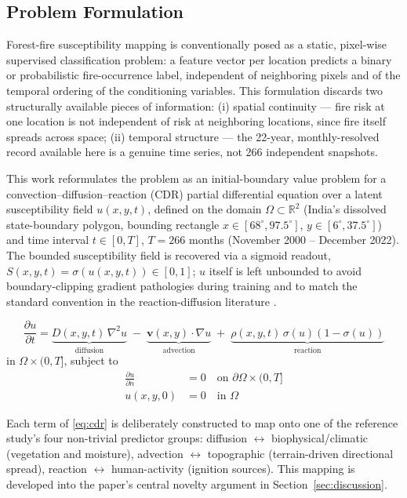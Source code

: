 \documentclass[journal]{IEEEtran}
\begin{document}
\subsection{Problem Formulation}

Forest-fire susceptibility mapping is conventionally posed as a static, pixel-wise supervised classification problem: a feature vector per location predicts a binary or probabilistic fire-occurrence label, independent of neighboring pixels and of the temporal ordering of the conditioning variables. This formulation discards two structurally available pieces of information: (i) spatial continuity --- fire risk at one location is not independent of risk at neighboring locations, since fire itself spreads across space; (ii) temporal structure --- the 22-year, monthly-resolved record available here is a genuine time series, not 266 independent snapshots.

This work reformulates the problem as an initial-boundary value problem for a convection--diffusion--reaction (CDR) partial differential equation over a latent susceptibility field $u(x,y,t)$, defined on the domain $\Omega \subset \mathbb{R}^2$ (India's dissolved state-boundary polygon, bounding rectangle $x\in[68^{\circ},97.5^{\circ}]$, $y\in[6^{\circ},37.5^{\circ}]$) and time interval $t\in[0,T]$, $T=266$ months (November 2000 -- December 2022). The bounded susceptibility field is recovered via a sigmoid readout, $S(x,y,t)=\sigma(u(x,y,t))\in[0,1]$; $u$ itself is left unbounded to avoid boundary-clipping gradient pathologies during training and to match the standard convention in the reaction-diffusion literature \cite{fisher1937}.

\begin{equation}
\frac{\partial u}{\partial t} = \underbrace{D(x,y,t)\,\nabla^2 u}_{\text{diffusion}} \;-\; \underbrace{\mathbf{v}(x,y)\cdot\nabla u}_{\text{advection}} \;+\; \underbrace{\rho(x,y,t)\,\sigma(u)(1-\sigma(u))}_{\text{reaction}}
\label{eq:cdr}
\end{equation}
in $\Omega\times(0,T]$, subject to
\begin{align}
\frac{\partial u}{\partial n} &= 0 \quad \text{on } \partial\Omega\times(0,T] \label{eq:bc}\\
u(x,y,0) &= 0 \quad \text{in } \Omega \label{eq:ic}
\end{align}

Each term of \eqref{eq:cdr} is deliberately constructed to map onto one of the reference study's four non-trivial predictor groups: diffusion $\leftrightarrow$ biophysical/climatic (vegetation and moisture), advection $\leftrightarrow$ topographic (terrain-driven directional spread), reaction $\leftrightarrow$ human-activity (ignition sources). This mapping is developed into the paper's central novelty argument in Section~\ref{sec:discussion}.
\end{document}

